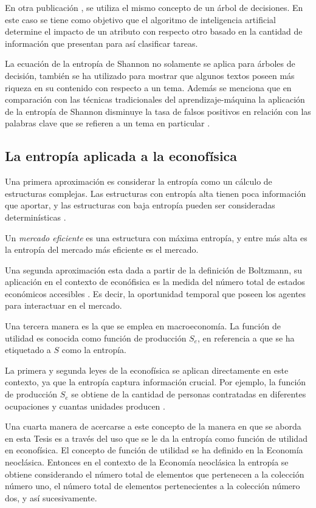 En otra publicación \citep{dos2012entropy}  , se utiliza el mismo concepto de un árbol de decisiones. 
En este caso se tiene como objetivo que el algoritmo de inteligencia artificial determine el impacto de un atributo con respecto otro basado en la cantidad de información que presentan para así clasificar tareas. 

La ecuación de la entropía de Shannon no solamente se aplica para árboles de decisión, también se ha utilizado para mostrar que algunos textos poseen más riqueza en su contenido con respecto a un tema. 
Además se menciona que en comparación con las técnicas tradicionales del aprendizaje-máquina la aplicación de la entropía de Shannon disminuye la tasa de falsos positivos en relación con las palabras clave que se refieren a un tema en particular \citep[][]{chan2022knowledge}.   
 
\subsection{La entropía aplicada a la econofísica}

Una primera aproximación es considerar la entropía como un cálculo de estructuras complejas. Las estructuras con entropía alta tienen poca información que aportar, y las estructuras con baja entropía pueden ser consideradas determinísticas \citep[][]{pincus2004irregularity}.

Un \textit{mercado eficiente} es una estructura con máxima entropía, y entre más alta es la entropía del mercado más eficiente es el mercado.

Una segunda aproximación esta dada a partir de la definición de Boltzmann, su aplicación en el contexto de econófisica es la medida del número total de estados económicos accesibles \citep[][]{richmond}. Es decir, la oportunidad temporal que poseen los agentes para interactuar en el mercado.

Una tercera manera es la que se emplea en macroeconomía. La función de utilidad es conocida como función de producción $S_e$, en referencia a que se ha etiquetado a $S$ como la entropía. 

La primera y segunda leyes de la econofísica se aplican directamente en este contexto, ya que la entropía captura información crucial. Por ejemplo, la función de producción $S_e$ se obtiene de la cantidad de personas contratadas en diferentes ocupaciones y cuantas unidades producen \citep[][pagina 170]{richmond}. 

Una cuarta manera de acercarse a este concepto de la manera en que se aborda en esta Tesis es a través del uso que se le da la entropía como función de utilidad en econofísica. El concepto de función de utilidad se ha definido en la Economía neoclásica. Entonces en el contexto de la Economía neoclásica la entropía se obtiene considerando el número total de elementos que pertenecen a la colección número uno, el número total de elementos pertenecientes a la colección número dos, y así sucesivamente. 


